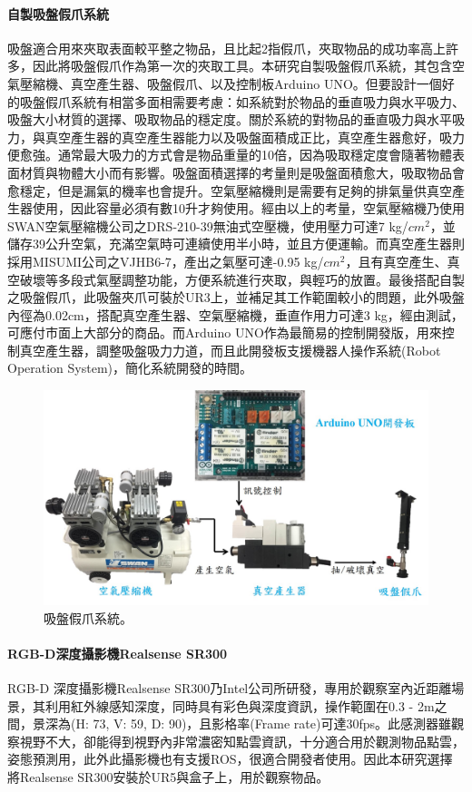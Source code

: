 \paragraph{自製吸盤假爪系統}
吸盤適合用來夾取表面較平整之物品，且比起2指假爪，夾取物品的成功率高上許多，因此將吸盤假爪作為第一次的夾取工具。本研究自製吸盤假爪系統，其包含空氣壓縮機、真空產生器、吸盤假爪、以及控制板Arduino UNO。但要設計一個好的吸盤假爪系統有相當多面相需要考慮：如系統對於物品的垂直吸力與水平吸力、吸盤大小材質的選擇、吸取物品的穩定度。關於系統的對物品的垂直吸力與水平吸力，與真空產生器的真空產生器能力以及吸盤面積成正比，真空產生器愈好，吸力便愈強。通常最大吸力的方式會是物品重量的10倍，因為吸取穩定度會隨著物體表面材質與物體大小而有影響。吸盤面積選擇的考量則是吸盤面積愈大，吸取物品會愈穩定，但是漏氣的機率也會提升。空氣壓縮機則是需要有足夠的排氣量供真空產生器使用，因此容量必須有數10升才夠使用。經由以上的考量，空氣壓縮機乃使用SWAN空氣壓縮機公司之DRS-210-39無油式空壓機，使用壓力可達7 kg/$cm^{2}$，並儲存39公升空氣，充滿空氣時可連續使用半小時，並且方便運輸。而真空產生器則採用MISUMI公司之VJHB6-7，產出之氣壓可達-0.95 kg/$cm^{2}$，且有真空產生、真空破壞等多段式氣壓調整功能，方便系統進行夾取，與輕巧的放置。最後搭配自製之吸盤假爪，此吸盤夾爪可裝於UR3上，並補足其工作範圍較小的問題，此外吸盤內徑為0.02cm，搭配真空產生器、空氣壓縮機，垂直作用力可達3 kg，經由測試，可應付市面上大部分的商品。而Arduino UNO作為最簡易的控制開發版，用來控制真空產生器，調整吸盤吸力力道，而且此開發板支援機器人操作系統(Robot Operation System)，簡化系統開發的時間。

\begin{figure}[]
	\centering
	\includegraphics[height=!, width=1.0\linewidth, keepaspectratio=true]
	{./figures/suction_system.jpg}
  \caption{吸盤假爪系統。}
  \label{figure:suction_gripper}
\end{figure}

\paragraph{RGB-D深度攝影機Realsense SR300}
RGB-D 深度攝影機Realsense SR300乃Intel公司所研發，專用於觀察室內近距離場景，其利用紅外線感知深度，同時具有彩色與深度資訊，操作範圍在0.3 - 2m之間，景深為(H: 73, V: 59, D: 90)，且影格率(Frame rate)可達30fps。此感測器雖觀察視野不大，卻能得到視野內非常濃密知點雲資訊，十分適合用於觀測物品點雲，姿態預測用，此外此攝影機也有支援ROS，很適合開發者使用。因此本研究選擇將Realsense SR300安裝於UR5與盒子上，用於觀察物品。

